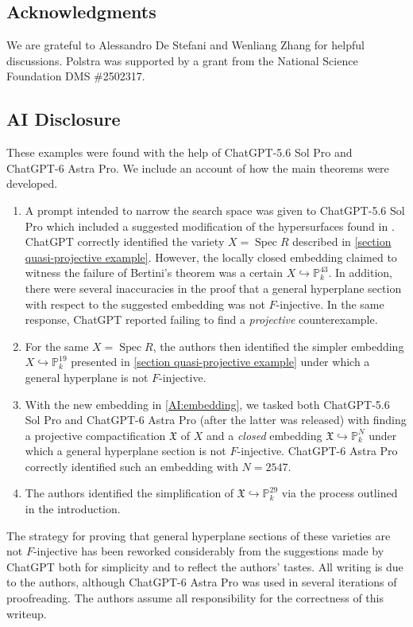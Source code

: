 \documentclass[reqno,11pt]{amsart}
\numberwithin{equation}{section}
\theoremstyle{definition}
\theoremstyle{definition}
\theoremstyle{definition}
\theoremstyle{remark}
\newcommand{\Spec}{\operatorname{Spec}}
\newcommand{\PP}{\mathbb{P}}
\begin{document}
\subsection*{Acknowledgments} 
    We are grateful to Alessandro De Stefani and Wenliang Zhang for helpful discussions. Polstra was supported by a grant from the National Science Foundation DMS \#2502317.
\subsection*{AI Disclosure} These examples were found with the help of ChatGPT-5.6 Sol Pro and ChatGPT-6 Astra Pro. We include an account of how the main theorems were developed.
\begin{enumerate}[label=(\arabic*)]
    \item A prompt intended to narrow the search space was given to ChatGPT-5.6 Sol Pro which included a suggested modification of the hypersurfaces found in \cite{QGSS24}. ChatGPT correctly identified the variety $X=\Spec R$ described in \cref{section quasi-projective example}. However, the locally closed embedding claimed to witness the failure of Bertini's theorem was a certain $X\hookrightarrow \PP^{43}_k$. In addition, there were several inaccuracies in the proof that a general hyperplane section with respect to the suggested embedding was not $F$-injective. In the same response, ChatGPT reported failing to find a \emph{projective} counterexample.
    \item For the same $X=\Spec R$, the authors then identified the simpler embedding $X\hookrightarrow \PP^{19}_k$ presented in \cref{section quasi-projective example} under which a general hyperplane is not $F$-injective.\label{AI:embedding}
    \item With the new embedding in \ref{AI:embedding}, we tasked both ChatGPT-5.6 Sol Pro and ChatGPT-6 Astra Pro (after the latter was released) with finding a projective compactification $\mathfrak{X}$ of $X$ and a \emph{closed} embedding $\mathfrak{X}\hookrightarrow \PP^N_k$ under which a general hyperplane section is not $F$-injective. ChatGPT-6 Astra Pro correctly identified such an embedding with $N=2547$.\label{AI:projective}
    \item The authors identified the simplification of $\mathfrak{X}\hookrightarrow \PP^{29}_k$ via the process outlined in the introduction.
\end{enumerate}
The strategy for proving that general hyperplane sections of these varieties are not $F$-injective has been reworked considerably from the suggestions made by ChatGPT both for simplicity and to reflect the authors' tastes. All writing is due to the authors, although ChatGPT-6 Astra Pro was used in several iterations of proofreading. The authors assume all responsibility for the correctness of this writeup.
\end{document}
